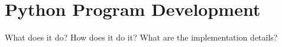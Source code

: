 \documentclass[../00_main.tex]{subfiles}
\begin{document}
\section{Python Program Development}

What does it do? How does it do it? What are the implementation details?
\end{document}
